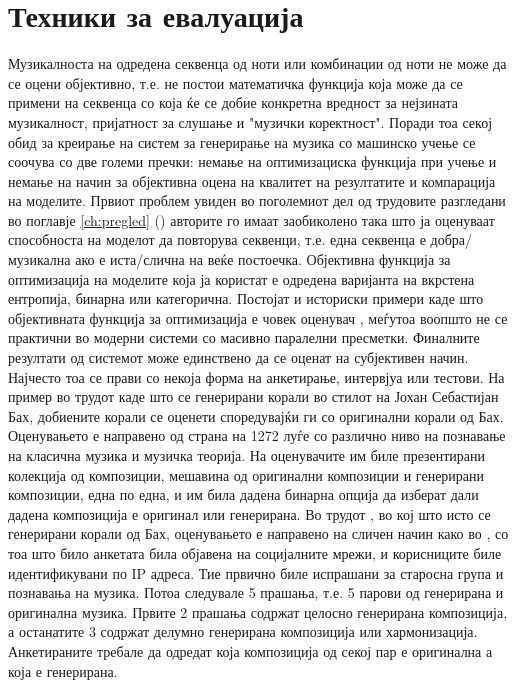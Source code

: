 \chapter{Техники за евалуација}
\label{ch:evaluacija}

Музикалноста на одредена секвенца од ноти или комбинации од ноти не може да се оцени објективно, т.е. не постои математичка функција која може да се примени на секвенца со која ќе се добие конкретна вредност за нејзината музикалност, пријатност за слушање и "музички коректност". Поради тоа секој обид за креирање на систем за генерирање на музика со машинско учење се соочува со две големи пречки: немање на оптимизациска функција при учење и немање на начин за објективна оцена на квалитет на резултатите и компарација на моделите. 
Првиот проблем увиден во поголемиот дел од трудовите разгледани во поглавје \ref{ch:pregled} (\cite{Tikhonov2017,Boulanger-Lewandowski2012,Boulanger-Lewandowski2014,Liang2017,Johnson2017,Yang2017,Eck2002,Goel2014}) авторите го имаат заобиколено така што ја оценуваат способноста на моделот да повторува секвенци, т.е. една секвенца е добра/музикална ако е иста/слична на веќе постоечка. Објективна функција за оптимизација на моделите која ја користат е одредена варијанта на вкрстена ентропија, бинарна или категорична. Постојат и историски примери каде што објективната функција за оптимизација е човек оценувач \cite{Biles1994}, меѓутоа воопшто не се практични во модерни системи со масивно паралелни пресметки.
Финалните резултати од системот може единствено да се оценат на субјективен начин. Најчесто тоа се прави со некоја форма на анкетирање, интервјуа или тестови. На пример во трудот \cite{Hadjeres2016} каде што се генерирани корали во стилот на Јохан Себастијан Бах, добиените корали се оценети споредувајќи ги со оригинални корали од Бах. Оценувањето е направено од страна на 1272 луѓе со различно ниво на познавање на класична музика и музичка теорија. На оценувачите им биле презентирани колекција од композиции, мешавина од оригинални композиции и генерирани композиции, една по една, и им била дадена бинарна опција да изберат дали дадена композиција е оригинал или генерирана.
Во трудот \cite{Liang2017}, во кој што исто се генерирани корали од Бах, оценувањето е направено на сличен начин како во \cite{Hadjeres2016}, со тоа што било анкетата била објавена на социјалните мрежи, и корисниците биле идентификувани по IP адреса. Тие првично биле испрашани за старосна група и познавања на музика. Потоа следувале 5 прашања, т.е. 5 парови од генерирана и оригинална музика. Првите 2 прашања содржат целосно генерирана композиција, а останатите 3 содржат делумно генерирана композиција или хармонизација. Анкетираните требале да одредат која композиција од секој пар е оригинална а која е генерирана.
